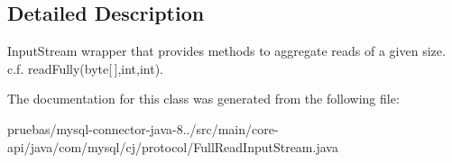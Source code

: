\subsection{Detailed Description}
Input\+Stream wrapper that provides methods to aggregate reads of a given size. c.\+f. read\+Fully(byte\mbox{[}$\,$\mbox{]},int,int). 

The documentation for this class was generated from the following file\+:\begin{DoxyCompactItemize}
\item 
pruebas/mysql-\/connector-\/java-\/8../src/main/core-\/api/java/com/mysql/cj/protocol/Full\+Read\+Input\+Stream.\+java\end{DoxyCompactItemize}

